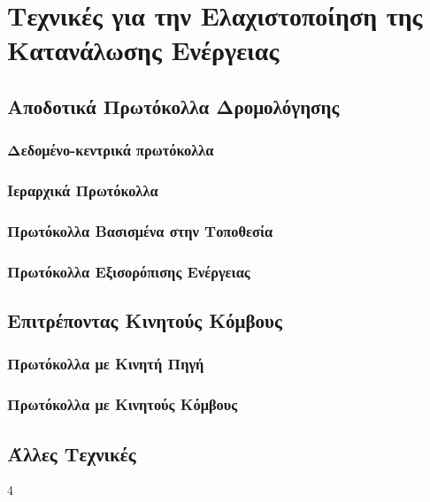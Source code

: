 
\chapter{Τεχνικές για την Ελαχιστοποίηση της Κατανάλωσης Ενέργειας}
\section{Αποδοτικά Πρωτόκολλα Δρομολόγησης}
\subsection{Δεδομένο-κεντρικά πρωτόκολλα}
\subsection{Ιεραρχικά Πρωτόκολλα}
\subsection{Πρωτόκολλα Βασισμένα στην Τοποθεσία}
\subsection{Πρωτόκολλα Εξισορόπισης Ενέργειας}
\section{Επιτρέποντας Κινητούς Κόμβους}
\subsection{Πρωτόκολλα με Κινητή Πηγή}
\subsection{Πρωτόκολλα με Κινητούς Κόμβους} %
\section{Άλλες Τεχνικές} %


4